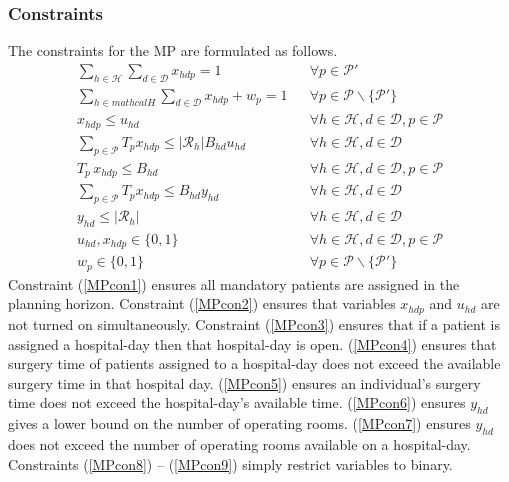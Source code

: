 \subsubsection*{Constraints} The constraints for the MP are formulated as follows.
\begin{align}
    \sum\limits_{h \in \mathcal{H}} \sum\limits_{d \in \mathcal{D}}x_{hdp} = 1 
        && \forall p \in \mathcal{P}' \label{MPcon1}\\
    \sum\limits_{h \in mathcal{H}} \sum\limits_{d \in \mathcal{D}} x_{hdp} + w_p = 1
        && \forall p \in \mathcal{P} \backslash \{\mathcal{P}'\}\label{MPcon2}\\
    x_{hdp} \leq u_{hd}
        && \forall h \in \mathcal{H}, d \in \mathcal{D}, p \in \mathcal{P}\label{MPcon3}\\
    \sum\limits_{p \in \mathcal{P}}T_px_{hdp} \leq |\mathcal{R}_h|B_{hd}u_{hd}
        && \forall h \in \mathcal{H}, d \in \mathcal{D} \label{MPcon4}\\
    T_p\,x_{hdp} \leq B_{hd} 
        && \forall h \in \mathcal{H}, d \in \mathcal{D}, p \in \mathcal{P}\label{MPcon5}\\
     \sum_{p \in \mathcal{P}}T_px_{hdp} \leq B_{hd}y_{hd}
        && \forall h \in \mathcal{H}, d\in \mathcal{D} \label{MPcon6}\\
        y_{hd} \leq |\mathcal{R}_h|
        && \forall h\in\mathcal{H}, d \in \mathcal{D} \label{MPcon7}\\
        u_{hd}, x_{hdp} \in \{ 0,1\}
        && \forall h\in \mathcal{H}, d \in \mathcal{D}, p \in \mathcal{P}\label{MPcon8}\\
        w_p \in \{0,1\}
        && \forall p \in \mathcal{P} \backslash\{\mathcal{P}'\}\label{MPcon9}
\end{align}
Constraint (\ref{MPcon1}) ensures all mandatory patients are assigned in the planning 
horizon. Constraint (\ref{MPcon2}) ensures that variables $x_{hdp}$ and $u_{hd}$ are not
turned on simultaneously. Constraint (\ref{MPcon3}) ensures that if a patient is assigned
a hospital-day then that hospital-day is open. (\ref*{MPcon4}) ensures that surgery time 
of patients assigned to a hospital-day does not exceed the available surgery time in
that hospital day. (\ref*{MPcon5}) ensures an individual's surgery time does not exceed 
the hospital-day's available time. (\ref*{MPcon6}) ensures $y_{hd}$ gives a lower bound 
on the number of operating rooms. (\ref*{MPcon7}) ensures $y_{hd}$ does not exceed the
number of operating rooms available on a hospital-day. Constraints (\ref*{MPcon8}) -- (\ref*{MPcon9}) simply restrict
variables to binary.

